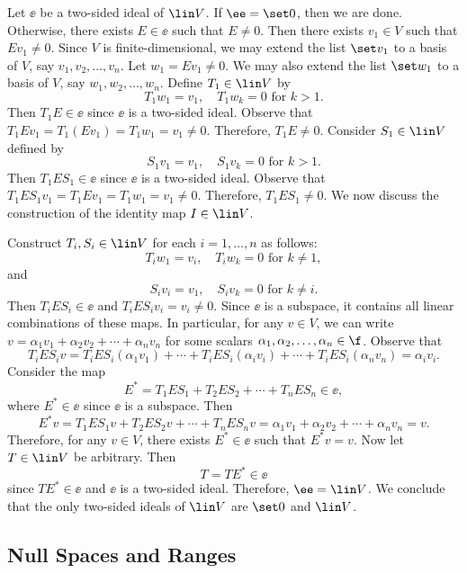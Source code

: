\begin{sol}
    Let $\ee$ be a two-sided ideal of $\lin V$. If $\ee = \set 0$, then we are done. Otherwise, there exists $E \in \ee$ such that $E \neq 0$. Then there exists $v_1 \in V$ such that $Ev_1 \neq 0$. Since $V$ is finite-dimensional, we may extend the list $\set v_1$ to a basis of $V$, say $v_1, v_2, \ldots, v_n$. Let $w_1 = Ev_1 \neq 0$. We may also extend the list $\set w_1$ to a basis of $V$, say $w_1, w_2, \ldots, w_n$. Define $T_1 \in \lin V$ by
    \[T_1w_1 = v_1, \quad T_1w_k = 0 \text{ for } k > 1.\]
    Then $T_1E \in \ee$ since $\ee$ is a two-sided ideal. Observe that $T_1Ev_1 = T_1(Ev_1) = T_1w_1 = v_1 \neq 0$. Therefore, $T_1E \neq 0$. Consider $S_1 \in \lin V$ defined by
    \[S_1v_1 = v_1, \quad S_1v_k = 0 \text{ for } k > 1.\]
    Then $T_1ES_1 \in \ee$ since $\ee$ is a two-sided ideal. Observe that $T_1ES_1v_1 = T_1Ev_1 = T_1w_1 = v_1 \neq 0$. Therefore, $T_1ES_1 \neq 0$. We now discuss the construction of the identity map $I \in \lin V$.
    
    Construct $T_i, S_i \in \lin V$ for each $i = 1, \ldots, n$ as follows:
    \[T_i w_1 = v_i, \quad T_i w_k = 0 \text{ for } k \neq 1,\]
    and
    \[S_i v_i = v_1, \quad S_i v_k = 0 \text{ for } k \neq i.\]
    Then $T_iES_i \in \ee$ and $T_iES_i v_i = v_i \neq 0$. Since $\ee$ is a subspace, it contains all linear combinations of these maps. In particular, for any $v \in V$, we can write $v = \alpha_1 v_1 + \alpha_2 v_2 + \cdots + \alpha_n v_n$ for some scalars $\alpha_1, \alpha_2, \ldots, \alpha_n \in \f$. Observe that
    \[T_iES_iv = T_iES_i(\alpha_1 v_1) + \cdots + T_iES_i(\alpha_i v_i) + \cdots + T_iES_i(\alpha_n v_n) = \alpha_i v_i.\]
    Consider the map
    \[E^* = T_1ES_1 + T_2ES_2 + \cdots + T_nES_n \in \ee,\]
    where $E^* \in \ee$ since $\ee$ is a subspace. Then
    \[E^*v = T_1ES_1 v + T_2ES_2 v + \cdots + T_nES_n v = \alpha_1 v_1 + \alpha_2 v_2 + \cdots + \alpha_n v_n = v.\]
    Therefore, for any $v \in V$, there exists $E^* \in \ee$ such that $E^*v = v$. Now let $T \in \lin V$ be arbitrary. Then
    \[T = TE^* \in \ee\]
    since $TE^* \in \ee$ and $\ee$ is a two-sided ideal. Therefore, $\ee = \lin V$. We conclude that the only two-sided ideals of $\lin V$ are $\set 0$ and $\lin V$.
\end{sol}

\newpage

\subsection{Null Spaces and Ranges}

